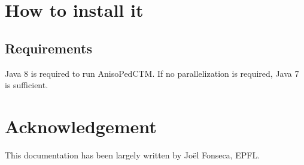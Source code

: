 \documentclass[a4paper,12pt]{article}
\begin{document}
\section{How to install it}

\subsection{Requirements}
Java 8 is required to run AnisoPedCTM. If no parallelization is required, Java 7 is sufficient.

\section{Acknowledgement}
This documentation has been largely written by Jo\"el Fonseca, EPFL.



\end{document}
